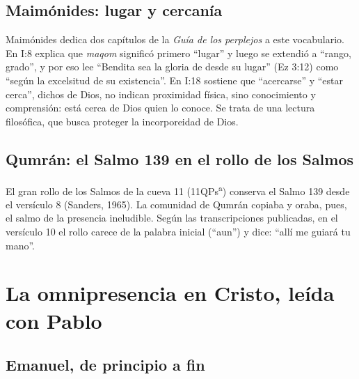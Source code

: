 \subsection{Maimónides: lugar y cercanía}

Maimónides dedica dos capítulos de la \emph{Guía de los perplejos} a este vocabulario. En I:8 explica que \emph{maqom} significó primero ``lugar'' y luego se extendió a ``rango, grado'', y por eso lee ``Bendita sea la gloria de \SENOR{} desde su lugar'' (Ez 3:12) como ``según la excelsitud de su existencia''. En I:18 sostiene que ``acercarse'' y ``estar cerca'', dichos de Dios, no indican proximidad física, sino conocimiento y comprensión: está cerca de Dios quien lo conoce. Se trata de una lectura filosófica, que busca proteger la incorporeidad de Dios.


\subsection{Qumrán: el Salmo 139 en el rollo de los Salmos}

El gran rollo de los Salmos de la cueva 11 (11QPs\textsuperscript{a}) conserva el Salmo 139 desde el versículo 8 (Sanders, 1965). La comunidad de Qumrán copiaba y oraba, pues, el salmo de la presencia ineludible. Según las transcripciones publicadas, en el versículo 10 el rollo carece de la palabra inicial  (``aun'') y dice: ``allí me guiará tu mano''.


\section{La omnipresencia en Cristo, leída con Pablo}\label{sec:cristo-omni}

\subsection{Emanuel, de principio a fin}


